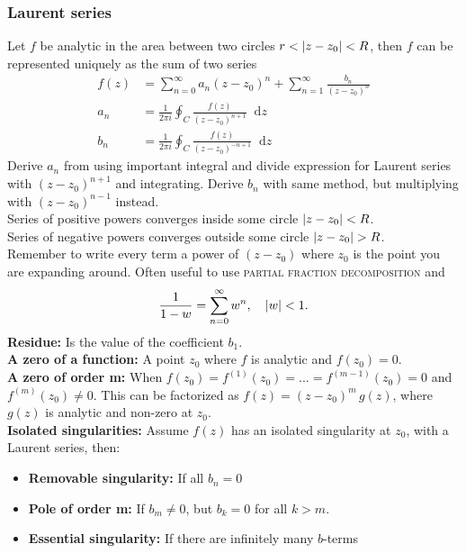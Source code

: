\documentclass[a4paper, 10pt]{article}
\newcommand*\diff{\mathop{}\!\mathrm{d}}
\begin{document}
\begin{multicols*}{3}
\subsubsection*{Laurent series}
Let $f$ be analytic in the area between two circles $r < \abs{z-z_0} < R$, then $f$ can be represented uniquely as the sum of two series
\begin{align*}
  f(z) &= \sum_{n=0}^{\infty} a_n(z-z_0)^n + \sum_{n=1}^{\infty} \frac{b_n}{(z-z_0)^n} \\
  a_n &= \frac{1}{2\pi i} \oint_C \frac{f(z)}{(z-z_0)^{n+1}} \diff z \\
  b_n &= \frac{1}{2\pi i} \oint_C \frac{f(z)}{(z-z_0)^{-n+1}} \diff z
\end{align*}
Derive $a_n$ from using important integral and divide expression for Laurent series with $(z-z_0)^{n+1}$ and integrating. Derive $b_n$ with same method, but multiplying with $(z-z_0)^{n-1}$ instead.\\
Series of positive powers converges inside  some circle $\abs{z-z_0} < R$. \\
Series of negative powers converges outside some circle $\abs{z-z_0} > R$. \\
Remember to write every term a power of $(z-z_0)$ where $z_0$ is the point you are expanding around.
Often useful to use \textsc{partial fraction decomposition} and
\begin{equation*}
  \frac{1}{1-w} = \sum_{n=0}^{\infty} w^n, \quad \abs{w}<1.
\end{equation*}
\textbf{Residue:} Is the value of the coefficient $b_1$.\\
\textbf{A zero of a function:} A point $z_0$ where $f$ is analytic and $f(z_0)=0$.\\
\textbf{A zero of order m:} When $f(z_0) = f^{(1)}(z_0) = ... = f^{(m-1)}(z_0)=0$ and $f^(m)(z_0)\neq 0$. This can be factorized as $f(z) = (z-z_0)^m\,g(z)$, where $g(z)$ is analytic and non-zero at $z_0$.\\
\textbf{Isolated singularities:} Assume $f(z)$ has an isolated singularity at $z_0$, with a Laurent series, then:
\begin{itemize}
  \item \textbf{Removable singularity:} If all $b_n=0$
  \item \textbf{Pole of order m:} If $b_m\neq 0$, but $b_k=0$ for all $k>m$.
  \item \textbf{Essential singularity:} If there are infinitely many $b$-terms
\end{itemize}


\end{multicols*}
\end{document}
